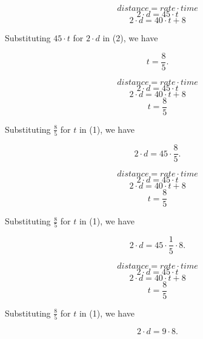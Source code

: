 \documentclass{beamer} %
\begin{document}
\setcounter{equation}{0}

\begin{frame}
\[
distance = rate \cdot time
\]
\begin{equation}
2\cdot d = 45\cdot t
\end{equation}
\begin{equation}
2\cdot d = 40\cdot t + 8
\end{equation}

Substituting $45\cdot t$ for $2\cdot d$ in (2), we have

\[
t = \frac{8}{5}.
\]
\end{frame}

\setcounter{equation}{0}

\begin{frame}
\[
distance = rate \cdot time
\]
\begin{equation}
2\cdot d = 45\cdot t
\end{equation}
\begin{equation}
2\cdot d = 40\cdot t + 8
\end{equation}
\begin{equation}
t = \frac{8}{5}
\end{equation}

\pause Substituting $\frac{8}{5}$ for $t$ in (1), we have \pause

\[
2\cdot d = 45\cdot \frac{8}{5}.
\]
\end{frame}

\setcounter{equation}{0}

\begin{frame}
\[
distance = rate \cdot time
\]
\begin{equation}
2\cdot d = 45\cdot t
\end{equation}
\begin{equation}
2\cdot d = 40\cdot t + 8
\end{equation}
\begin{equation}
t = \frac{8}{5}
\end{equation}

Substituting $\frac{8}{5}$ for $t$ in (1), we have

\[
2\cdot d = 45\cdot \frac{1}{5}\cdot 8.
\]
\end{frame}

\setcounter{equation}{0}

\begin{frame}
  \[distance = rate \cdot time\]
  \begin{equation}
    2\cdot d = 45\cdot t
  \end{equation}
  \begin{equation}
    2\cdot d = 40\cdot t + 8
  \end{equation}
  \begin{equation}
    t = \frac{8}{5}
  \end{equation}

  Substituting $\frac{8}{5}$ for $t$ in (1), we have

  \[2\cdot d = 9\cdot 8.\]
\end{frame}
\end{document}
